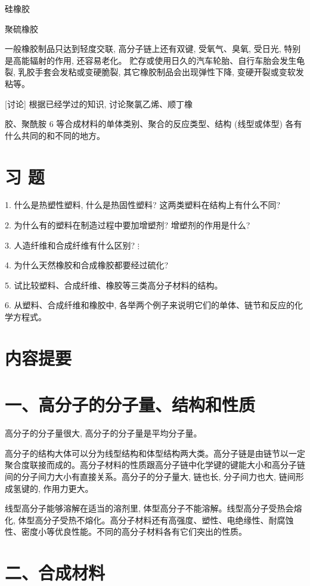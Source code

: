 \documentclass[10pt]{article}
\begin{document}
硅橡胶

聚硫橡胶

一般橡胶制品只达到轻度交联, 高分子链上还有双键, 受氧气、臭氧, 受日光, 特别是高能辐射的作用, 还容易老化。 贮存或使用日久的汽车轮胎、自行车胎会发生龟裂, 乳胶手套会发粘或变硬脆裂, 其它橡胶制品会出现弹性下降, 变硬开裂或变软发粘等。

[讨论] 根据已经学过的知识, 讨论聚氯乙烯、顺丁橡

胶、聚酰胺 6 等合成材料的单体类别、聚合的反应类型、结构 (线型或体型) 各有什么共同的和不同的地方。

\section*{习 题}

1. 什么是热塑性塑料, 什么是热固性塑料? 这两类塑料在结构上有什么不同?

2. 为什么有的塑料在制造过程中要加增塑剂? 增塑剂的作用是什么?

3. 人造纤维和合成纤维有什么区别? \(\vdots\)

4. 为什么天然橡胶和合成橡胶都要经过硫化?

5. 试比较塑料、合成纤维、橡胶等三类高分子材料的结构。

6. 从塑料、合成纤维和橡胶中, 各举两个例子来说明它们的单体、链节和反应的化学方程式。

\section*{内容提要}

\section*{一、高分子的分子量、结构和性质}

高分子的分子量很大, 高分子的分子量是平均分子量。

高分子的结构大体可以分为线型结构和体型结构两大类。高分子链是由链节以一定聚合度联接而成的。高分子材料的性质跟高分子链中化学键的键能大小和高分子链间的分子间力大小有直接关系。高分子的分子量大, 链也长, 分子间力也大, 链间形成氢键的, 作用力更大。

线型高分子能够溶解在适当的溶剂里, 体型高分子不能溶解。线型高分子受热会熔化, 体型高分子受热不熔化。高分子材料还有高强度、塑性、电绝缘性、耐腐蚀性、密度小等优良性能。不同的高分子材料各有它们突出的性质。

\section*{二、合成材料}
\end{document}
